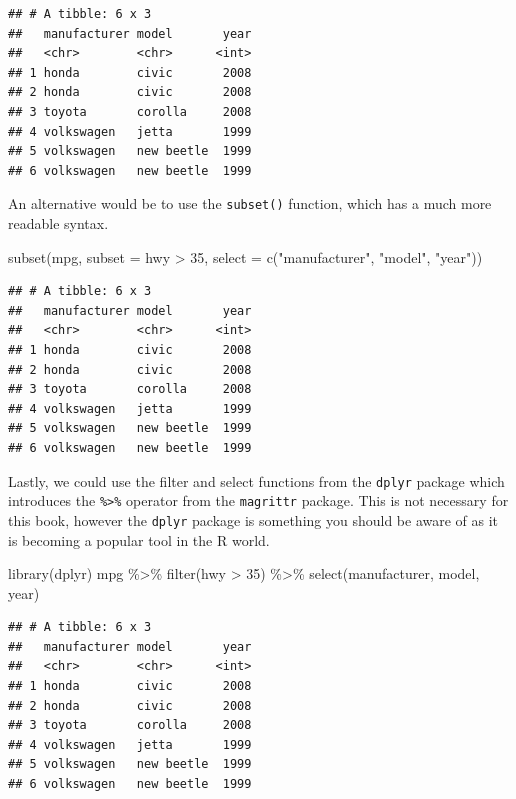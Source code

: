 \documentclass[
]{book}
\newenvironment{Shaded}{\begin{snugshade}}{\end{snugshade}}
\newcommand{\AttributeTok}[1]{\textcolor[rgb]{0.77,0.63,0.00}{#1}}
\newcommand{\DecValTok}[1]{\textcolor[rgb]{0.00,0.00,0.81}{#1}}
\newcommand{\FunctionTok}[1]{\textcolor[rgb]{0.00,0.00,0.00}{#1}}
\newcommand{\NormalTok}[1]{#1}
\newcommand{\SpecialCharTok}[1]{\textcolor[rgb]{0.00,0.00,0.00}{#1}}
\newcommand{\StringTok}[1]{\textcolor[rgb]{0.31,0.60,0.02}{#1}}
\begin{document}
\begin{verbatim}
## # A tibble: 6 x 3
##   manufacturer model       year
##   <chr>        <chr>      <int>
## 1 honda        civic       2008
## 2 honda        civic       2008
## 3 toyota       corolla     2008
## 4 volkswagen   jetta       1999
## 5 volkswagen   new beetle  1999
## 6 volkswagen   new beetle  1999
\end{verbatim}

An alternative would be to use the \texttt{subset()} function, which has a much more readable syntax.

\begin{Shaded}
\begin{Highlighting}[]
\FunctionTok{subset}\NormalTok{(mpg, }\AttributeTok{subset =}\NormalTok{ hwy }\SpecialCharTok{\textgreater{}} \DecValTok{35}\NormalTok{, }\AttributeTok{select =} \FunctionTok{c}\NormalTok{(}\StringTok{"manufacturer"}\NormalTok{, }\StringTok{"model"}\NormalTok{, }\StringTok{"year"}\NormalTok{))}
\end{Highlighting}
\end{Shaded}

\begin{verbatim}
## # A tibble: 6 x 3
##   manufacturer model       year
##   <chr>        <chr>      <int>
## 1 honda        civic       2008
## 2 honda        civic       2008
## 3 toyota       corolla     2008
## 4 volkswagen   jetta       1999
## 5 volkswagen   new beetle  1999
## 6 volkswagen   new beetle  1999
\end{verbatim}

Lastly, we could use the filter and select functions from the \texttt{dplyr} package which introduces the \texttt{\%\textgreater{}\%} operator from the \texttt{magrittr} package. This is not necessary for this book, however the \texttt{dplyr} package is something you should be aware of as it is becoming a popular tool in the R world.

\begin{Shaded}
\begin{Highlighting}[]
\FunctionTok{library}\NormalTok{(dplyr)}
\NormalTok{mpg }\SpecialCharTok{\%\textgreater{}\%} \FunctionTok{filter}\NormalTok{(hwy }\SpecialCharTok{\textgreater{}} \DecValTok{35}\NormalTok{) }\SpecialCharTok{\%\textgreater{}\%} \FunctionTok{select}\NormalTok{(manufacturer, model, year)}
\end{Highlighting}
\end{Shaded}

\begin{verbatim}
## # A tibble: 6 x 3
##   manufacturer model       year
##   <chr>        <chr>      <int>
## 1 honda        civic       2008
## 2 honda        civic       2008
## 3 toyota       corolla     2008
## 4 volkswagen   jetta       1999
## 5 volkswagen   new beetle  1999
## 6 volkswagen   new beetle  1999
\end{verbatim}
\end{document}
